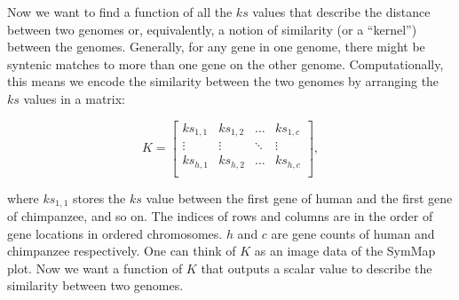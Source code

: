 \documentclass{vgtc}                      %
\begin{document}

Now we want to find a function of all the $ks$ values that describe the distance between two genomes or, equivalently, a notion of similarity (or a ``kernel'') between the genomes.
Generally, for any gene in one genome, there might be syntenic matches to more than one gene on the other genome. Computationally, this means we encode the similarity between the two genomes by arranging the $ks$ values in a matrix:

$$K = 
\begin{bmatrix}
ks_{1,1} & ks_{1,2} & \dots & ks_{1, c}\\
\vdots & \vdots & \ddots & \vdots \\
ks_{h,1} & ks_{h,2} & \dots & ks_{h, c}\\
\end{bmatrix},
$$

\noindent where $ks_{1,1}$ stores the $ks$ value between the first gene of human and the first gene of chimpanzee, and so on. The indices of rows and columns are in the order of gene locations in ordered chromosomes.
$h$ and $c$ are gene counts of human and chimpanzee respectively. One can think of $K$ as an image data of the SymMap plot. Now we want a function of $K$ that outputs a scalar value to describe the similarity between two genomes.
\end{document}

